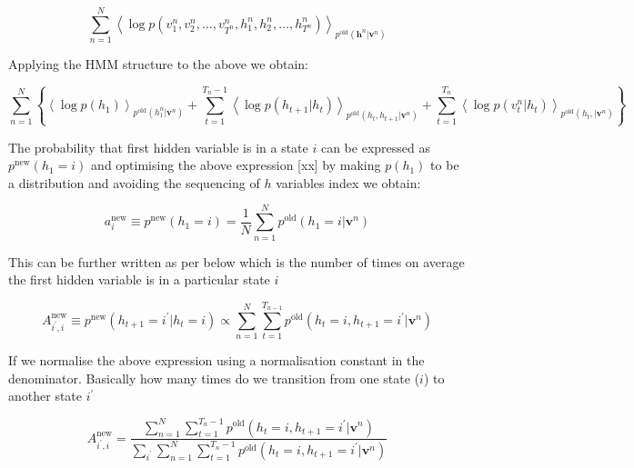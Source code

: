 \begin{equation}
    \sum_{n=1}^{N} {
        \left\langle \log p
            (
                v_1^n,v_2^n,\dots,v_{\text{$T^n$}}^n,h_1^n,h_2^n,\dots,h_{\text{$T^n$}}^n
            )
        \right\rangle
        }_{p^{\text{old}} (\mathbf{h}^n|\mathbf{v}^n)}
\end{equation}

Applying the HMM structure to the above we obtain:

\begin{equation}
    \sum_{n=1}^{N} \left\{
        {\left\langle\log p (h_1)\right\rangle}_{p^{\text{old}} (h_1^n|\mathbf{v}^n)}
        +
        \sum_{t=1}^{T_n - 1}
        {\left\langle \log p ( h_{t+1}|h_t ) \right\rangle}_{p^{\text{old}} (h_t,h_{t+1}|\mathbf{v}^n)}
        +
        \sum_{t=1}^{T_n}
        {\left\langle \log p ( v_t^n | h_t ) \right\rangle}_{p^{\text{old}} (h_t,|\mathbf{v}^n)}
    \right\}
\end{equation}

The probability that first hidden variable is in a state $i$ can be expressed as $p^{\text{new}} (h_1=i)$ and optimising the above expression [xx] by making $p(h_1)$ to be a distribution and avoiding the sequencing of $h$ variables index we obtain:

\begin{equation}\label{Eq:4.22}
    a_i^{\text{new}} \equiv p^{\text{new}} (h_1=i) = \dfrac{1}{N}
    \sum_{n=1}^{N} p^{\text{old}} (h_1=i|\mathbf{v}^n )
\end{equation}

This can be further written as per below which is the number of times on average the first hidden variable is in a particular state $i$

\begin{equation}\label{Eq:4.23}
    A_{i^\prime,i}^{\text{new}}\equiv
    p^{\text{new}}
    ( h_{t+1} = i^\prime | h_t = i )
    \propto
    \sum_{n=1}^{N}
    \sum_{t=1}^{T_{n-1}}
    p^{\text{old}} ( h_t = i,h_{t+1} = i^\prime|\mathbf{v}^n )
\end{equation}

If we normalise the above expression using a normalisation constant in the denominator. Basically how many times do we transition from one state ($i$) to another state $i^\prime$

\begin{equation}\label{Eq:4.24}
    A_{i^\prime,i}^{\text{new}} =
    \dfrac
        {
            \sum_{n=1}^{N}
            \sum_{t=1}^{T_n -1}
            p^{\text{old}} ( h_t = i,h_{t+1} = i^\prime|\mathbf{v}^n )
        }
        {
            \sum_{i^\prime}
            \sum_{n=1}^{N}
            \sum_{t=1}^{T_n -1}
            p^{\text{old}} ( h_t = i,h_{t+1} = i^\prime|\mathbf{v}^n )
        }
\end{equation}


